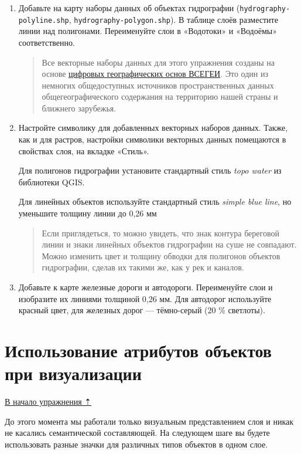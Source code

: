 \documentclass[
  12pt,
]{book}
\begin{document}
\begin{enumerate}
\def\labelenumi{\arabic{enumi}.}
\item
  Добавьте на карту наборы данных об объектах гидрографии (\texttt{hydrography-polyline.shp}, \texttt{hydrography-polygon.shp}). В таблице слоёв разместите линии над полигонами. Переименуйте слои в «Водотоки» и «Водоёмы» соответственно.

  \begin{quote}
  Все векторные наборы данных для этого упражнения созданы на основе \href{http://www.vsegei.com/ru/info/topo/}{цифровых географических основ ВСЕГЕИ}. Это один из немногих общедоступных источников пространственных данных общегеографического содержания на территорию нашей страны и ближнего зарубежья.
  \end{quote}
\item
  Настройте символику для добавленных векторных наборов данных. Также, как и для растров, настройки символики векторных данных помещаются в свойствах слоя, на вкладке «Стиль».

  Для полигонов гидрографии установите стандартный стиль \emph{topo water} из библиотеки QGIS.

  Для линейных объектов используйте стандартный стиль \emph{simple blue line}, но уменьшите толщину линии до 0,26 мм

  \begin{quote}
  Если приглядеться, то можно увидеть, что знак контура береговой линии и знаки линейных объектов гидрографии на суше не совпадают. Можно изменить цвет и толщину обводки для полигонов объектов гидрографии, сделав их такими же, как у рек и каналов.
  \end{quote}
\item
  Добавьте к карте железные дороги и автодороги. Переименуйте слои и изобразите их линиями толщиной 0,26 мм. Для автодорог используйте красный цвет, для железных дорог --- тёмно-серый (20 \% светлоты).
\end{enumerate}

\hypertarget{map-design-general-attributes}{%
\section{Использование атрибутов объектов при визуализации}\label{map-design-general-attributes}}

\protect\hyperlink{map-design-general}{В начало упражнения ⇡}

До этого момента мы работали только визуальным представлением слоя и никак не касались семантической составляющей. На следующем шаге вы будете использовать разные значки для различных типов объектов в одном слое.
\end{document}
